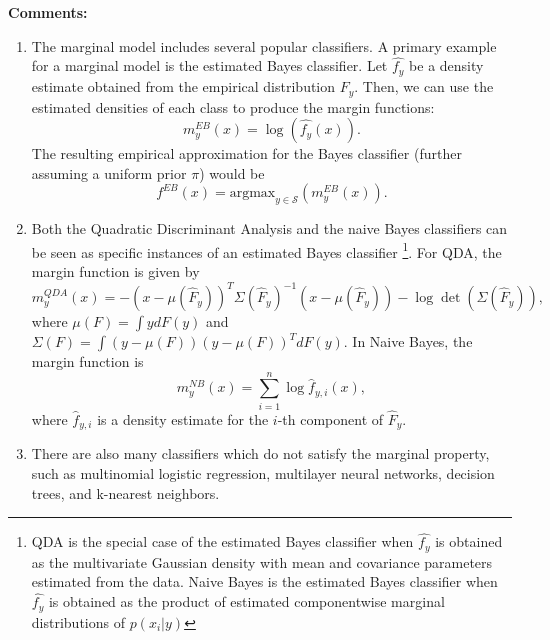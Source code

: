\documentclass[12pt]{article}
\begin{document}
\textbf{Comments:}
\begin{enumerate}
\item The marginal model includes several popular classifiers.
A primary example for a marginal model is the estimated Bayes
classifier. Let $\hat{f_y}$ be a density estimate obtained from the
empirical distribution $\hat{F_y}$. Then, we can use the estimated
densities of each class to produce the margin functions:
\[ m^{EB}_y(x) = \log(\hat{f_{y}}(x)).\]
The resulting empirical approximation for the Bayes classifier
(further assuming a uniform prior $\pi$) would be
\[ f^{EB}(x) = \text{argmax}_{y \in \mathcal{S}}(m^{EB}_y(x)).\]
\item Both the Quadratic Discriminant Analysis and the naive Bayes classifiers can be seen as specific instances of an estimated Bayes classifier
\footnote{QDA is the special case of the estimated Bayes classifier when $\hat{f_y}$ is obtained as
the multivariate Gaussian density with mean and covariance parameters estimated from the data.
Naive Bayes is the estimated Bayes classifier when $\hat{f_y}$ is obtained as the product of estimated componentwise marginal distributions
of $p(x_i|y)$}. 
For QDA, the margin function is
given by
\[
m_y^{QDA}(x) = -(x - \mu(\hat{F}_y))^T \Sigma(\hat{F}_y)^{-1} (x-\mu(\hat{F}_y)) - \log\det(\Sigma(\hat{F}_y)),
\]
where $\mu(F) = \int y dF(y)$ and $\Sigma(F) = \int (y-\mu(F))(y-\mu(F))^T dF(y)$.
In Naive Bayes, the margin function is
\[
m^{NB}_y(x) = \sum_{i=1}^n \log \hat{f}_{y, i}(x),
\]
where $\hat{f}_{y, i}$ is a density estimate for the $i$-th component of
$\hat{F}_y$.
\item There are also many classifiers which do not satisfy the marginal property, such as multinomial logistic regression,
multilayer neural networks, decision trees, and k-nearest neighbors.
\end{enumerate}
\end{document}
